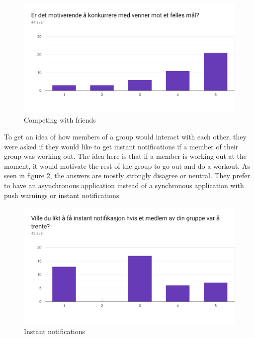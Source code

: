 \begin{figure}[H]
    \centering
    \includegraphics[width=120mm]{figures/KonkurereVenner.png}
    \caption{Competing with friends}
    \label{data}
\end{figure}
To get an idea of how members of a group would interact with each other, they were asked if they would like to get instant notifications if a member of their group was working out. The idea here is that if a member is working out at the moment, it would motivate the rest of the group to go out and do a workout.
As seen in figure \ref{instaN}, the answers are mostly strongly disagree or neutral. They prefer to have an asynchronous application instead of a synchronous application with push warnings or instant notifications.
\begin{figure}[H]
    \centering
    \includegraphics[width=120mm]{figures/InstantNotifikasjon.png}
    \caption{Instant notifications}
    \label{instaN}
\end{figure}

